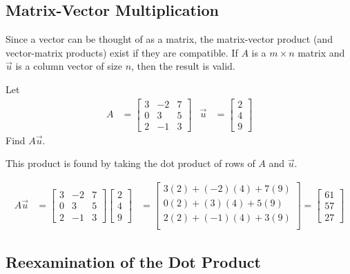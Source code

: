 \subsection{Matrix-Vector Multiplication}

Since a vector can be thought of as a matrix, the matrix-vector product (and vector-matrix products) exist if they are compatible.  If $A$ is a $m \times n$ matrix and $\vec{u}$ is a column vector of size $n$, then the result is valid.


\begin{example}
Let
%
\begin{align*}
A & = \begin{bmatrix}
3 & -2 & 7 \\
0 & 3 & 5 \\
2 & -1 & 3
\end{bmatrix} & \vec{u} & = \begin{bmatrix}
2 \\ 4 \\ 9
\end{bmatrix}
\end{align*}
Find $A\vec{u}$.

\solution

This product is found by taking the dot product of rows of $A$ and $\vec{u}$.

\begin{align*}
A \vec{u} & = \begin{bmatrix}
3 & -2 & 7 \\
0 & 3 & 5 \\
2 & -1 & 3
\end{bmatrix}\begin{bmatrix}
2 \\ 4 \\ 9
\end{bmatrix}
 & = \begin{bmatrix}
3 (2) + (-2)(4) + 7 (9) \\
0 (2) + (3)(4) + 5 (9) \\
2 (2) + (-1)(4) + 3 (9) \\
\end{bmatrix} = \begin{bmatrix}
61 \\
57 \\
27
\end{bmatrix}
\end{align*}
\end{example}


\subsection{Reexamination of the Dot Product}

